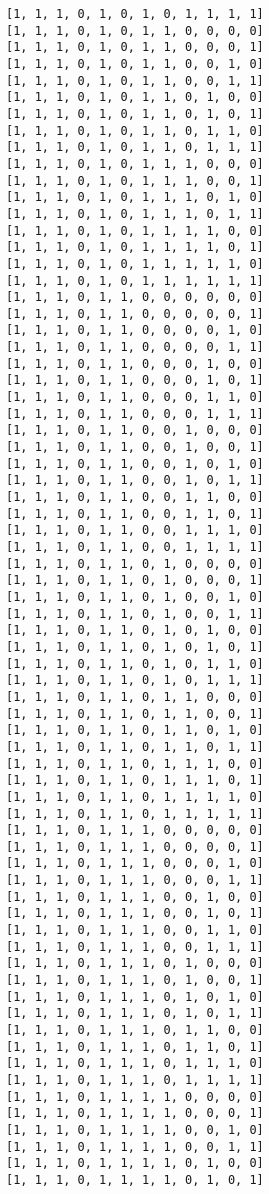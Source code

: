 \documentclass[11pt]{article}
\begin{document}
\begin{Verbatim}[commandchars=\\\{\}]
[1, 1, 1, 0, 1, 0, 1, 0, 1, 1, 1, 1]
[1, 1, 1, 0, 1, 0, 1, 1, 0, 0, 0, 0]
[1, 1, 1, 0, 1, 0, 1, 1, 0, 0, 0, 1]
[1, 1, 1, 0, 1, 0, 1, 1, 0, 0, 1, 0]
[1, 1, 1, 0, 1, 0, 1, 1, 0, 0, 1, 1]
[1, 1, 1, 0, 1, 0, 1, 1, 0, 1, 0, 0]
[1, 1, 1, 0, 1, 0, 1, 1, 0, 1, 0, 1]
[1, 1, 1, 0, 1, 0, 1, 1, 0, 1, 1, 0]
[1, 1, 1, 0, 1, 0, 1, 1, 0, 1, 1, 1]
[1, 1, 1, 0, 1, 0, 1, 1, 1, 0, 0, 0]
[1, 1, 1, 0, 1, 0, 1, 1, 1, 0, 0, 1]
[1, 1, 1, 0, 1, 0, 1, 1, 1, 0, 1, 0]
[1, 1, 1, 0, 1, 0, 1, 1, 1, 0, 1, 1]
[1, 1, 1, 0, 1, 0, 1, 1, 1, 1, 0, 0]
[1, 1, 1, 0, 1, 0, 1, 1, 1, 1, 0, 1]
[1, 1, 1, 0, 1, 0, 1, 1, 1, 1, 1, 0]
[1, 1, 1, 0, 1, 0, 1, 1, 1, 1, 1, 1]
[1, 1, 1, 0, 1, 1, 0, 0, 0, 0, 0, 0]
[1, 1, 1, 0, 1, 1, 0, 0, 0, 0, 0, 1]
[1, 1, 1, 0, 1, 1, 0, 0, 0, 0, 1, 0]
[1, 1, 1, 0, 1, 1, 0, 0, 0, 0, 1, 1]
[1, 1, 1, 0, 1, 1, 0, 0, 0, 1, 0, 0]
[1, 1, 1, 0, 1, 1, 0, 0, 0, 1, 0, 1]
[1, 1, 1, 0, 1, 1, 0, 0, 0, 1, 1, 0]
[1, 1, 1, 0, 1, 1, 0, 0, 0, 1, 1, 1]
[1, 1, 1, 0, 1, 1, 0, 0, 1, 0, 0, 0]
[1, 1, 1, 0, 1, 1, 0, 0, 1, 0, 0, 1]
[1, 1, 1, 0, 1, 1, 0, 0, 1, 0, 1, 0]
[1, 1, 1, 0, 1, 1, 0, 0, 1, 0, 1, 1]
[1, 1, 1, 0, 1, 1, 0, 0, 1, 1, 0, 0]
[1, 1, 1, 0, 1, 1, 0, 0, 1, 1, 0, 1]
[1, 1, 1, 0, 1, 1, 0, 0, 1, 1, 1, 0]
[1, 1, 1, 0, 1, 1, 0, 0, 1, 1, 1, 1]
[1, 1, 1, 0, 1, 1, 0, 1, 0, 0, 0, 0]
[1, 1, 1, 0, 1, 1, 0, 1, 0, 0, 0, 1]
[1, 1, 1, 0, 1, 1, 0, 1, 0, 0, 1, 0]
[1, 1, 1, 0, 1, 1, 0, 1, 0, 0, 1, 1]
[1, 1, 1, 0, 1, 1, 0, 1, 0, 1, 0, 0]
[1, 1, 1, 0, 1, 1, 0, 1, 0, 1, 0, 1]
[1, 1, 1, 0, 1, 1, 0, 1, 0, 1, 1, 0]
[1, 1, 1, 0, 1, 1, 0, 1, 0, 1, 1, 1]
[1, 1, 1, 0, 1, 1, 0, 1, 1, 0, 0, 0]
[1, 1, 1, 0, 1, 1, 0, 1, 1, 0, 0, 1]
[1, 1, 1, 0, 1, 1, 0, 1, 1, 0, 1, 0]
[1, 1, 1, 0, 1, 1, 0, 1, 1, 0, 1, 1]
[1, 1, 1, 0, 1, 1, 0, 1, 1, 1, 0, 0]
[1, 1, 1, 0, 1, 1, 0, 1, 1, 1, 0, 1]
[1, 1, 1, 0, 1, 1, 0, 1, 1, 1, 1, 0]
[1, 1, 1, 0, 1, 1, 0, 1, 1, 1, 1, 1]
[1, 1, 1, 0, 1, 1, 1, 0, 0, 0, 0, 0]
[1, 1, 1, 0, 1, 1, 1, 0, 0, 0, 0, 1]
[1, 1, 1, 0, 1, 1, 1, 0, 0, 0, 1, 0]
[1, 1, 1, 0, 1, 1, 1, 0, 0, 0, 1, 1]
[1, 1, 1, 0, 1, 1, 1, 0, 0, 1, 0, 0]
[1, 1, 1, 0, 1, 1, 1, 0, 0, 1, 0, 1]
[1, 1, 1, 0, 1, 1, 1, 0, 0, 1, 1, 0]
[1, 1, 1, 0, 1, 1, 1, 0, 0, 1, 1, 1]
[1, 1, 1, 0, 1, 1, 1, 0, 1, 0, 0, 0]
[1, 1, 1, 0, 1, 1, 1, 0, 1, 0, 0, 1]
[1, 1, 1, 0, 1, 1, 1, 0, 1, 0, 1, 0]
[1, 1, 1, 0, 1, 1, 1, 0, 1, 0, 1, 1]
[1, 1, 1, 0, 1, 1, 1, 0, 1, 1, 0, 0]
[1, 1, 1, 0, 1, 1, 1, 0, 1, 1, 0, 1]
[1, 1, 1, 0, 1, 1, 1, 0, 1, 1, 1, 0]
[1, 1, 1, 0, 1, 1, 1, 0, 1, 1, 1, 1]
[1, 1, 1, 0, 1, 1, 1, 1, 0, 0, 0, 0]
[1, 1, 1, 0, 1, 1, 1, 1, 0, 0, 0, 1]
[1, 1, 1, 0, 1, 1, 1, 1, 0, 0, 1, 0]
[1, 1, 1, 0, 1, 1, 1, 1, 0, 0, 1, 1]
[1, 1, 1, 0, 1, 1, 1, 1, 0, 1, 0, 0]
[1, 1, 1, 0, 1, 1, 1, 1, 0, 1, 0, 1]

\end{Verbatim}
\end{document}
